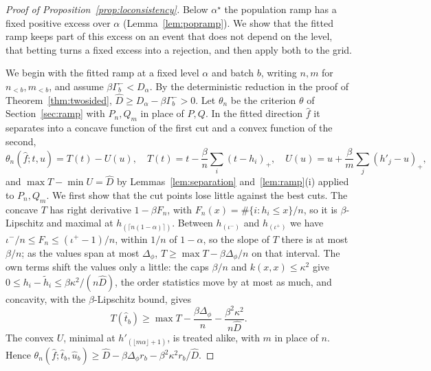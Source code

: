 \begin{proof}[Proof of Proposition~\ref{prop:loconsistency}]
Below $\alpha^\star$ the population ramp has a fixed positive excess over $\alpha$ (Lemma~\ref{lem:popramp}). We show
that the fitted ramp keeps part of this excess on an event that does not depend on the level, that betting turns a fixed excess
into a rejection, and then apply both to the grid.

We begin with the fitted ramp at a fixed level $\alpha$ and batch $b$, writing $n,m$ for $n_{<b},m_{<b}$, and assume
$\beta\Gamma_b^-<D_\alpha$. By the deterministic reduction in the proof of Theorem~\ref{thm:twosided},
$\widehat D\ge D_\alpha-\beta\Gamma_b^->0$. Let $\theta_n$ be the criterion $\theta$ of Section~\ref{sec:ramp} with
$P_n,Q_m$ in place of $P,Q$. In the fitted direction $\widehat f$ it separates into a concave function of the first cut
and a convex function of the second,
\[
\theta_n(\widehat f;t,u)=T(t)-U(u),\quad T(t)=t-\frac\beta n\sum_i(t-h_i)_+,\quad U(u)=u+\frac\beta m\sum_j(h'_j-u)_+,
\]
and $\max T-\min U=\widehat D$ by Lemmas~\ref{lem:separation} and~\ref{lem:ramp}(i) applied to $P_n,Q_m$. We first show
that the cut points lose little against the best cuts. The concave $T$ has right derivative $1-\beta F_n$, with $F_n(x)=\#\{i:h_i\le x\}/n$, so it
is $\beta$-Lipschitz and maximal at $h_{(\lceil n(1-\alpha)\rceil)}$. Between $h_{(\iota^-)}$ and $h_{(\iota^+)}$ we have
$\iota^-/n\le F_n\le(\iota^+-1)/n$, within $1/n$ of $1-\alpha$, so the slope of $T$ there is at most $\beta/n$; as the
values span at most $\Delta_\phi$, $T\ge\max T-\beta\Delta_\phi/n$ on that interval. The own terms shift the values only
a little: the caps $\beta/n$ and $k(x,x)\le\kappa^2$ give $0\le h_i-\tilde h_i\le\beta\kappa^2/(n\widehat D)$, the order
statistics move by at most as much, and concavity, with the $\beta$-Lipschitz bound, gives
\[
T(\widehat t_b)\ge\max T-\frac{\beta\Delta_\phi}n-\frac{\beta^2\kappa^2}{n\widehat D} .
\]
The convex $U$, minimal at $h'_{(\lfloor m\alpha\rfloor+1)}$, is treated alike, with $m$ in place of $n$. Hence
$\theta_n(\widehat f;\widehat t_b,\widehat u_b)\ge\widehat D-\beta\Delta_\phi r_b-\beta^2\kappa^2r_b/\widehat D$.


\end{proof}
